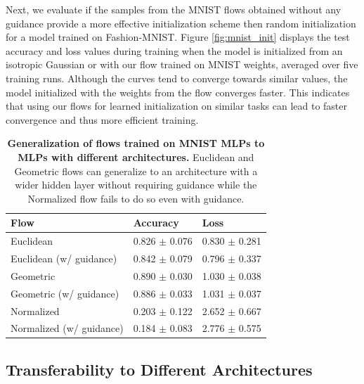 Next, we evaluate if the samples from the MNIST flows obtained without any guidance provide a more effective initialization scheme then random initialization for a model trained on Fashion-MNIST. Figure \ref{fig:mnist_init} displays the test accuracy and loss values during training when the model is initialized from an isotropic Gaussian or with our flow trained on MNIST weights, averaged over five training runs. Although the curves tend to converge towards similar values, the model initialized with the weights from the flow converges faster. This indicates that using our flows for learned initialization on similar tasks can lead to faster convergence and thus more efficient training.

\begin{table}[t!]
    \centering
    \begin{tabular}{lll}
        \toprule
        \textbf{Flow} & \textbf{Accuracy} & \textbf{Loss} \\
        \midrule
        Euclidean                   & 0.826 $\pm$ 0.076     & 0.830 $\pm$ 0.281 \\
        Euclidean (w/ guidance)     & 0.842 $\pm$ 0.079     & 0.796 $\pm$ 0.337 \\
        \midrule
        Geometric                  & 0.890 $\pm$ 0.030     & 1.030 $\pm$ 0.038 \\
        Geometric (w/ guidance)    & 0.886 $\pm$ 0.033     & 1.031 $\pm$ 0.037 \\
        \midrule
        Normalized                   & 0.203 $\pm$ 0.122     & 2.652 $\pm$ 0.667 \\
        Normalized (w/ guidance)     & 0.184 $\pm$ 0.083     & 2.776 $\pm$ 0.575 \\
        \bottomrule
    \end{tabular}
    \caption{\label{tab:arch_mnist_generalization}\textbf{Generalization of flows trained on MNIST MLPs to MLPs with different architectures.} Euclidean and Geometric flows can generalize to an architecture with a wider hidden layer without requiring guidance while the Normalized flow fails to do so even with guidance.}
\end{table}

\subsection{Transferability to Different Architectures} \label{sec:arch_generalization}


